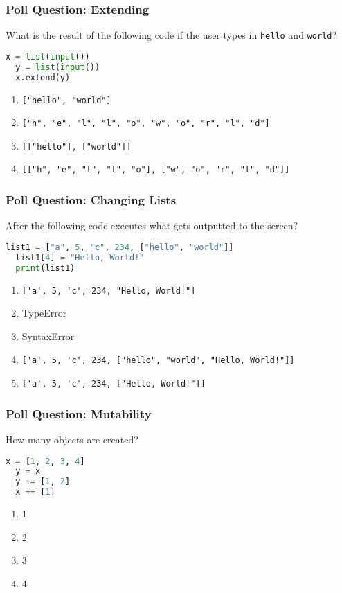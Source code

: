 \documentclass[xcolor=table]{beamer}
\begin{document}
%
%
\begin{frame}[fragile]
  \frametitle{Poll Question: Extending}
  What is the result of the following code if the user types in
  \lstinline|hello| and \lstinline|world|?
  \begin{lstlisting}[language=Python, autogobble]
  x = list(input())
  y = list(input())
  x.extend(y)
  \end{lstlisting}
  \vfill
  \begin{enumerate}[A] 
    \item \lstinline|["hello", "world"]|
    \item \lstinline|["h", "e", "l", "l", "o", "w", "o", "r", "l", "d"]|
    \item \lstinline|[["hello"], ["world"]]|
    \item \lstinline|[["h", "e", "l", "l", "o"], ["w", "o", "r", "l", "d"]]|
  \end{enumerate}
\end{frame}


%
%
\begin{frame}[fragile]
  \frametitle{Poll Question: Changing Lists}
  After the following code executes what gets outputted to the screen?
  \begin{lstlisting}[language=Python, autogobble]
  list1 = ["a", 5, "c", 234, ["hello", "world"]]
  list1[4] = "Hello, World!"
  print(list1)
  \end{lstlisting}
  \vfill
  \begin{enumerate}[A] 
    \item \lstinline|['a', 5, 'c', 234, "Hello, World!"]| %
    \item TypeError
    \item SyntaxError
    \item \lstinline|['a', 5, 'c', 234, ["hello", "world", "Hello, World!"]]|
    \item \lstinline|['a', 5, 'c', 234, ["Hello, World!"]]|
  \end{enumerate}
\end{frame}

%
%
\begin{frame}[fragile]
  \frametitle{Poll Question: Mutability} 
  How many objects are created?
  \begin{lstlisting}[language=Python, autogobble]
  x = [1, 2, 3, 4]
  y = x
  y += [1, 2]
  x += [1]
  \end{lstlisting}
  \vfill
  \begin{enumerate}[A] 
    \item 1
    \item 2
    \item 3
    \item 4
  \end{enumerate}
\end{frame}
\end{document}
